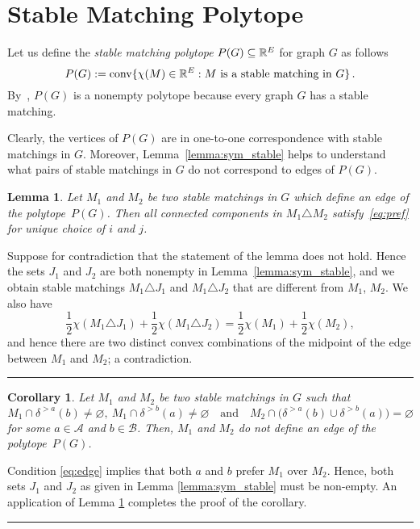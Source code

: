 \documentclass[3p,times]{elsarticle}
\newtheorem{lemma}[fact]{Lemma}
\newtheorem{corollary}[fact]{Corollary}
\newenvironment{proof}{{\bf Proof:  }}{\hfill\rule{2mm}{2mm}}
\DeclareMathOperator{\convOp}{conv}
\newcommand{\conv}{\convOp}
\begin{document}
\section{Stable Matching Polytope}

Let us define the \emph{stable matching polytope} $P(G)\subseteq\mathbb{R}^E$ for graph $G$ as follows
$$
	P(G):=\conv\{\chi(M)\in\R^E: M \text{ is a stable matching in } G\}\,.
$$
By~\cite{gale1962college}, $P(G)$ is a nonempty polytope because every
graph $G$ has a stable matching.

Clearly, the vertices of $P(G)$ are in one-to-one correspondence with
stable matchings in $G$. Moreover, Lemma~\ref{lemma:sym_stable} helps
to understand what pairs of stable matchings in $G$ do not correspond
to edges of $P(G)$.

\begin{lemma}\label{lemma:edge}
  Let $M_1$ and $M_2$ be two stable matchings in $G$ which define an
  edge of the polytope~$P(G)$. 
  Then all connected components in
  $M_1\triangle M_2$ satisfy~\eqref{eq:pref} for unique choice of $i$
  and $j$. 
\end{lemma}
\begin{proof}
  Suppose for contradiction that the statement of the lemma does not
  hold. Hence the sets $J_1$ and $J_2$ are both nonempty in
  Lemma~\ref{lemma:sym_stable}, and we obtain stable matchings
  $M_1\triangle J_1$ and $M_1\triangle J_2$ that are different from $M_1$,
  $M_2$. 
  We also have 
  \[ \frac{1}{2}\chi(M_1\triangle J_1)+\frac{1}{2}\chi(M_1\triangle
  J_2) =\frac{1}{2}\chi(M_1)+\frac{1}{2}\chi(M_2),\]
  and hence there are two distinct convex combinations of the midpoint
  of the edge between $M_1$ and $M_2$; a contradiction. 
\end{proof}


\begin{corollary}\label{cor:edge}
Let $M_1$ and $M_2$ be two stable matchings in $G$ such that
\begin{equation}\label{eq:edge}
M_1\cap\delta^{>a}(b)\neq\varnothing,\
M_1\cap\delta^{>b}(a)\neq\varnothing\quad\text{and}\quad
M_2\cap\big(\delta^{>a}(b)\cup \delta^{>b}(a)\big)=\varnothing
\end{equation}
 for some $a\in\mathcal{A}$ and $b\in\mathcal{B}$. Then, $M_1$ and $M_2$ do not define an edge of the polytope~$P(G)$.
\end{corollary}
\begin{proof}
  Condition \eqref{eq:edge} implies that both $a$ and $b$ prefer
  $M_1$ over $M_2$. Hence, both sets $J_1$ and $J_2$ as given in Lemma
  \ref{lemma:sym_stable} must be non-empty. An application of Lemma
  \ref{lemma:edge} completes the proof of the corollary.
\end{proof}
\end{document}
